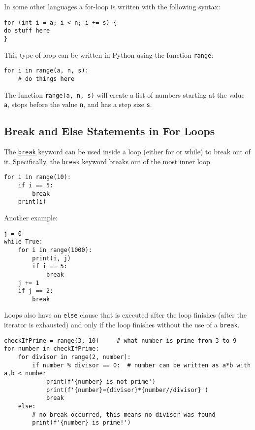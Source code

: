 \documentclass[12pt, a4paper]{article}
\begin{document}
In some other languages a for-loop is written with the following syntax:
\lstset{language=jupyter-python,label= ,caption= ,captionpos=b,numbers=none}
\begin{lstlisting}
for (int i = a; i < n; i += s) {
do stuff here
}
\end{lstlisting}

This type of loop can be written in Python using the function \texttt{range}:
\lstset{language=jupyter-python,label= ,caption= ,captionpos=b,numbers=none}
\begin{lstlisting}
for i in range(a, n, s):
    # do things here
\end{lstlisting}
The function \texttt{range(a, n, s)} will create a list of numbers starting at the value \texttt{a}, stops before the value \texttt{n}, and has a step size \texttt{s}.
\subsection{Break and Else Statements in For Loops}
\label{sec:orge46c2e9}
The \href{https://docs.python.org/3.6/tutorial/controlflow.html?\#break-and-continue-statements-and-else-clauses-on-loops}{\texttt{break}} keyword can be used inside a loop (either for or while) to break out of it.
Specifically, the \texttt{break} keyword breaks out of the most inner loop.
\lstset{language=jupyter-python,label= ,caption= ,captionpos=b,numbers=none}
\begin{lstlisting}
for i in range(10):
    if i == 5:
        break
    print(i)
\end{lstlisting}
Another example:
\lstset{language=jupyter-python,label= ,caption= ,captionpos=b,numbers=none}
\begin{lstlisting}
j = 0
while True:
    for i in range(1000):
        print(i, j)
        if i == 5:
            break
    j += 1
    if j == 2:
        break
\end{lstlisting}

Loops also have an \texttt{else} clause that is executed after the loop finishes (after the iterator is exhausted) and only if the loop finishes without the use of a \texttt{break}.
\lstset{language=jupyter-python,label= ,caption= ,captionpos=b,numbers=none}
\begin{lstlisting}
checkIfPrime = range(3, 10)     # what number is prime from 3 to 9
for number in checkIfPrime:
    for divisor in range(2, number):
        if number % divisor == 0:  # number can be written as a*b with a,b < number
            print(f'{number} is not prime')
            print(f'{number}={divisor}*{number//divisor}')
            break
    else:
        # no break occurred, this means no divisor was found
        print(f'{number} is prime!')
\end{lstlisting}
\end{document}
